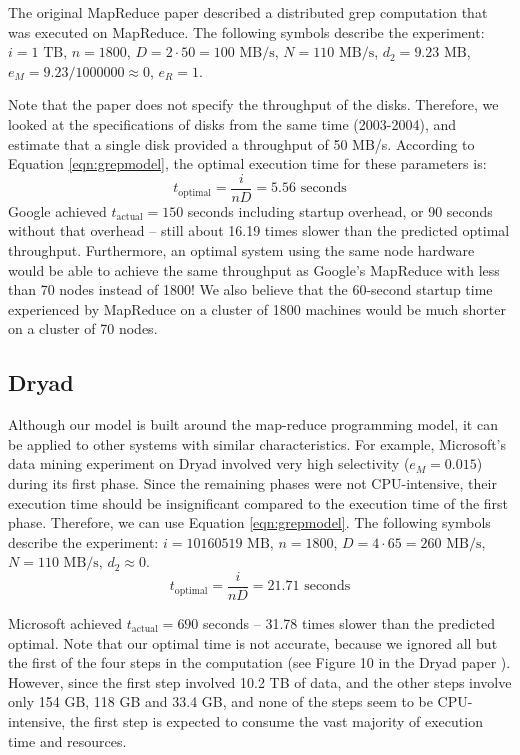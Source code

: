 \documentclass[ 11pt, letterpaper]{article}%
\begin{document}
The original MapReduce paper \cite{mapreduce} described a distributed grep
computation that was executed on MapReduce. The following symbols describe
the experiment: $i = 1 \text{ TB}$, $n = 1800$, $D = 2 \cdot 50 = 100 \text{ MB/s}$, $N = 110
\text{ MB/s}$, $d_2 = 9.23 \text{ MB}$, $e_M = 9.23/1000000 \approx 0$, $e_R =
1$.

Note that the paper does not specify the throughput of the disks. Therefore, we
looked at the specifications of disks from the same time (2003-2004), and
estimate that a single disk provided a throughput of 50 MB/s. According to
Equation \ref{eqn:grepmodel}, the optimal execution time for these parameters
is:
\[t_\text{optimal} = \frac{i}{n D} = 5.56 \text{ seconds}\]
Google achieved $t_\text{actual} = 150$ seconds including startup overhead, or
90 seconds without that overhead -- still about 16.19 times slower than the
predicted optimal throughput. Furthermore, an optimal system using
the same node hardware would be able to achieve the
same throughput as Google's MapReduce with less than 70 nodes instead of 1800!
We also believe that the 60-second startup time experienced by MapReduce on a
cluster of 1800 machines would be much shorter on a cluster of 70 nodes.

\subsection{Dryad}

Although our model is built around the map-reduce programming model, it can be
applied to other systems with similar characteristics. For example,
Microsoft's data mining experiment on Dryad \cite{dryad} involved very high
selectivity ($e_M = 0.015$) during its first phase. Since the remaining phases
were not CPU-intensive, their execution time should be insignificant compared to
the execution time of the first phase. Therefore, we can use Equation
\ref{eqn:grepmodel}. The following symbols describe
the experiment: $i = 10160519 \text{ MB}$, $n = 1800$, $D = 4 \cdot 65 = 260
\text{ MB/s}$, $N = 110 \text{ MB/s}$, $d_2 \approx 0$. \[t_\text{optimal} = \frac{i}{n D} =
21.71 \text{ seconds}\]

Microsoft achieved $t_\text{actual} = 690$ seconds -- 31.78 times slower than
the predicted optimal. Note that our optimal time is not accurate, because
we ignored all but the first of the four steps in the computation (see Figure
10 in the Dryad paper \cite{dryad}). However, since the first step involved
10.2 TB of data, and the other steps involve only 154 GB, 118 GB and 33.4 GB,
and none of the steps seem to be CPU-intensive, the first step is expected to
consume the vast majority of execution time and resources.
\end{document}
